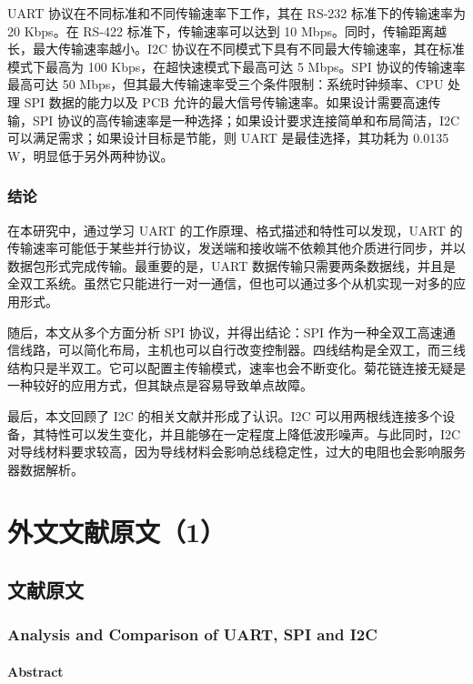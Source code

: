 \documentclass[12pt,a4paper]{article}
\numberwithin{equation}{section}
\begin{document}
UART 协议在不同标准和不同传输速率下工作，其在 RS-232 标准下的传输速率为 20 Kbps。在 RS-422 标准下，传输速率可以达到 10 Mbps。同时，传输距离越长，最大传输速率越小。I2C 协议在不同模式下具有不同最大传输速率，其在标准模式下最高为 100 Kbps，在超快速模式下最高可达 5 Mbps。SPI 协议的传输速率最高可达 50 Mbps，但其最大传输速率受三个条件限制：系统时钟频率、CPU 处理 SPI 数据的能力以及 PCB 允许的最大信号传输速率。如果设计需要高速传输，SPI 协议的高传输速率是一种选择；如果设计要求连接简单和布局简洁，I2C 可以满足需求；如果设计目标是节能，则 UART 是最佳选择，其功耗为 0.0135 W，明显低于另外两种协议。

\subsubsection*{结论}

在本研究中，通过学习 UART 的工作原理、格式描述和特性可以发现，UART 的传输速率可能低于某些并行协议，发送端和接收端不依赖其他介质进行同步，并以数据包形式完成传输。最重要的是，UART 数据传输只需要两条数据线，并且是全双工系统。虽然它只能进行一对一通信，但也可以通过多个从机实现一对多的应用形式。

随后，本文从多个方面分析 SPI 协议，并得出结论：SPI 作为一种全双工高速通信线路，可以简化布局，主机也可以自行改变控制器。四线结构是全双工，而三线结构只是半双工。它可以配置主传输模式，速率也会不断变化。菊花链连接无疑是一种较好的应用方式，但其缺点是容易导致单点故障。

最后，本文回顾了 I2C 的相关文献并形成了认识。I2C 可以用两根线连接多个设备，其特性可以发生变化，并且能够在一定程度上降低波形噪声。与此同时，I2C 对导线材料要求较高，因为导线材料会影响总线稳定性，过大的电阻也会影响服务器数据解析。


\clearpage
\section{外文文献原文（1）}
\subsection{文献原文}
\subsubsection*{Analysis and Comparison of UART, SPI and I2C}

\paragraph{Abstract}
\end{document}
